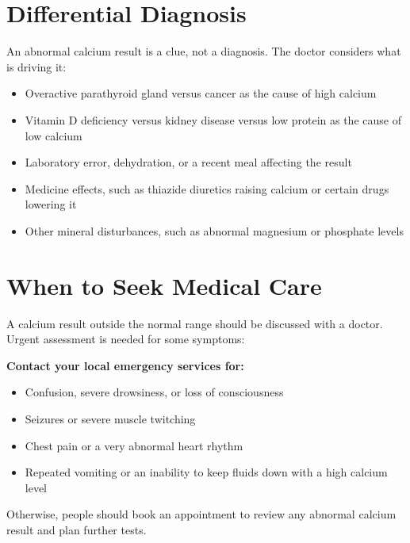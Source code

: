 \section*{Differential Diagnosis}
An abnormal calcium result is a clue, not a diagnosis. The doctor considers what is driving it:
\begin{itemize}
    \item Overactive parathyroid gland versus cancer as the cause of high calcium
    \item Vitamin D deficiency versus kidney disease versus low protein as the cause of low calcium
    \item Laboratory error, dehydration, or a recent meal affecting the result
    \item Medicine effects, such as thiazide diuretics raising calcium or certain drugs lowering it
    \item Other mineral disturbances, such as abnormal magnesium or phosphate levels
\end{itemize}

\section*{When to Seek Medical Care}
A calcium result outside the normal range should be discussed with a doctor. Urgent assessment is needed for some symptoms:

\textbf{Contact your local emergency services for:}
\begin{itemize}
    \item Confusion, severe drowsiness, or loss of consciousness
    \item Seizures or severe muscle twitching
    \item Chest pain or a very abnormal heart rhythm
    \item Repeated vomiting or an inability to keep fluids down with a high calcium level
\end{itemize}

Otherwise, people should book an appointment to review any abnormal calcium result and plan further tests.


